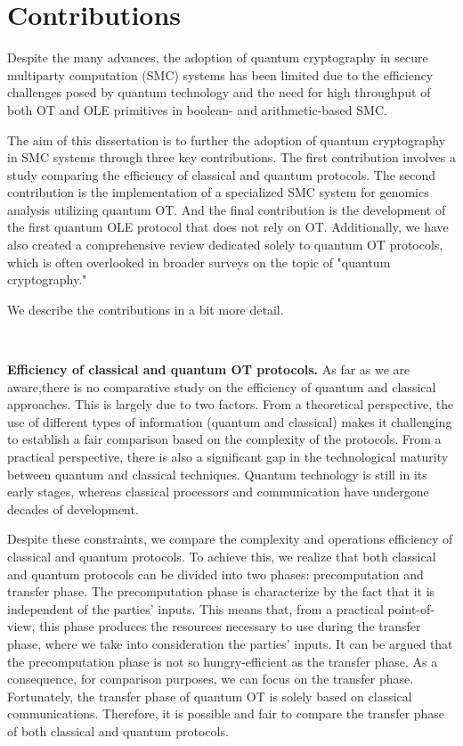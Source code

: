 \section*{Contributions} %

Despite the many advances, the adoption of quantum cryptography in secure multiparty computation (SMC) systems has been limited due to the efficiency challenges posed by quantum technology and the need for high throughput of both OT and OLE primitives in boolean- and arithmetic-based SMC.

The aim of this dissertation is to further the adoption of quantum cryptography in SMC systems through three key contributions. The first contribution involves a study comparing the efficiency of classical and quantum protocols. The second contribution is the implementation of a specialized SMC system for genomics analysis utilizing quantum OT. And the final contribution is the development of the first quantum OLE protocol that does not rely on OT. Additionally, we have also created a comprehensive review dedicated solely to quantum OT protocols, which is often overlooked in broader surveys on the topic of "quantum cryptography."

We describe the contributions in a bit more detail.

\

\noindent\textbf{Efficiency of classical and quantum OT protocols.} As far as we are aware,there is no comparative study on the efficiency of quantum and classical approaches. This is largely due to two factors. From a theoretical perspective, the use of different types of information (quantum and classical) makes it challenging to establish a fair comparison based on the complexity of the protocols. From a practical perspective, there is also a significant gap in the technological maturity between quantum and classical techniques. Quantum technology is still in its early stages, whereas classical processors and communication have undergone decades of development.


Despite these constraints, we compare the complexity and operations efficiency of classical and quantum protocols. To achieve this, we realize that both classical and quantum protocols can be divided into two phases: precomputation and transfer phase. The precomputation phase is characterize by the fact that it is independent of the parties' inputs. This means that, from a practical point-of-view, this phase produces the resources necessary to use during the transfer phase, where we take into consideration the parties' inputs. It can be argued that the precomputation phase is not so hungry-efficient as the transfer phase. As a consequence, for comparison purposes, we can focus on the transfer phase. Fortunately, the transfer phase of quantum OT is solely based on classical communications. Therefore, it is possible and fair to compare the transfer phase of both classical and quantum protocols. 

